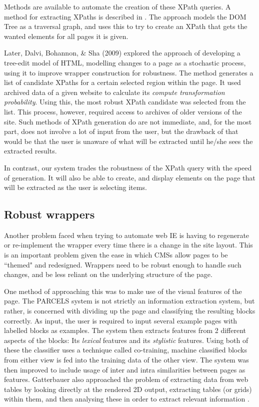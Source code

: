 Methods are available to automate the creation of these XPath queries. A method for extracting
XPaths is described in \cite{Anton2004}. The approach models the DOM Tree as a traversal graph,
and uses this to try to create an XPath that gets the wanted elements for all pages it is given.

Later,  Dalvi, Bohannon, \& Sha (2009) explored the approach of developing a tree-edit model of HTML,
modelling changes to a page as a stochastic process, using it to improve wrapper construction
for robustness. The method generates a list of candidate XPaths for a certain selected region
within the page. It used archived data of a given website to calculate its \textit{compute
transformation probability}. Using this, the most robust XPath candidate was selected from the
list. This process, however, required access to archives of older versions of the site. Such
methods of XPath generation do are not immediate, and, for the most part, does not involve a
lot of input from the user, but the drawback of that would be that the user is unaware of what
will be extracted until he/she sees the extracted results.

In contrast, our system trades the robustness of the XPath
query with the speed of generation. It will also be able to create, and display
elements on the page that will be extracted as the user is selecting items.

\subsection{Robust wrappers}
Another problem faced when trying to automate web IE is having to regenerate or re-implement
the wrapper every time there is a change in the site layout. This is an important problem given
the ease in which CMSs allow pages to be ``themed" and redesigned. Wrappers need
to be robust enough to handle such changes, and be less reliant on the underlying
structure of the page.
	
One method of approaching this was to make use of the visual features of the page. The PARCELS \cite{Lee2004}
system is not strictly an information extraction system, but rather, is concerned with dividing
up the page and classifying the resulting blocks correctly. As input, the user is required to
input several example pages with labelled blocks as examples. The system then extracts features
from 2 different aspects of the blocks: Its \textit{lexical} features and its
\textit{stylistic} features. Using both of these the classifier uses a technique called
co-training, machine classified blocks from either view is fed into the training data of the
other view. The system was then improved to include usage of inter and intra
similarities between pages as features\cite{AikMiang2005}. Gatterbauer also approached the
problem of extracting data from web tables by looking directly at the rendered 2D output,
extracting tables (or grids) within them, and then analysing these in order to extract relevant
information \cite{Gatterbauer2007}.







